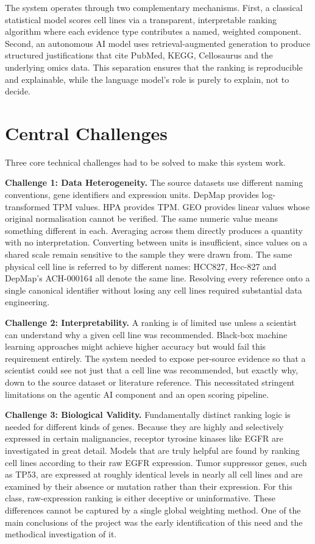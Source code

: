 \documentclass[author={Karen Coutinho, Ishaan Bhalla, Aman Raj, Dixit Kaloorani Malarmannan},
                supervisor={Dr. Daniel D'Andrea},
                degree={MSc},
                title={CellSelector Omics: A Multi-Omics Recommendation System for Cell Line Selection},
                subtitle={},
                type={},
                year={2026}]{dissertation}
\begin{document}
The system operates through two complementary mechanisms. First, a classical statistical model scores cell lines via a transparent, interpretable ranking algorithm where each evidence type contributes a named, weighted component. Second, an autonomous AI model uses retrieval-augmented generation to produce structured justifications that cite PubMed, KEGG, Cellosaurus and the underlying omics data. This separation ensures that the ranking is reproducible and explainable, while the language model's role is purely to explain, not to decide.

\section{Central Challenges}

Three core technical challenges had to be solved to make this system work.

{\bf Challenge 1: Data Heterogeneity.} The source datasets use different naming conventions, gene identifiers and expression units. DepMap provides log-transformed TPM values. HPA provides TPM. GEO provides linear values whose original normalisation cannot be verified. The same numeric value means something different in each. Averaging across them directly produces a quantity with no interpretation. Converting between units is insufficient, since values on a shared scale remain sensitive to the sample they were drawn from. The same physical cell line is referred to by different names: HCC827, Hcc-827 and DepMap's ACH-000164 all denote the same line. Resolving every reference onto a single canonical identifier without losing any cell lines required substantial data engineering.

{\bf Challenge 2: Interpretability.} A ranking is of limited use unless a scientist can understand why a given cell line was recommended. Black-box machine learning approaches might achieve higher accuracy but would fail this requirement entirely. The system needed to expose per-source evidence so that a scientist could see not just that a cell line was recommended, but exactly why, down to the source dataset or literature reference. This necessitated stringent limitations on the agentic AI component and an open scoring pipeline.

{\bf Challenge 3: Biological Validity.} Fundamentally distinct ranking logic is needed for different kinds of genes. Because they are highly and selectively expressed in certain malignancies, receptor tyrosine kinases like EGFR are investigated in great detail. Models that are truly helpful are found by ranking cell lines according to their raw EGFR expression. Tumor suppressor genes, such as TP53, are expressed at roughly identical levels in nearly all cell lines and are examined by their absence or mutation rather than their expression. For this class, raw-expression ranking is either deceptive or uninformative. These differences cannot be captured by a single global weighting method. One of the main conclusions of the project was the early identification of this need and the methodical investigation of it.
\end{document}
